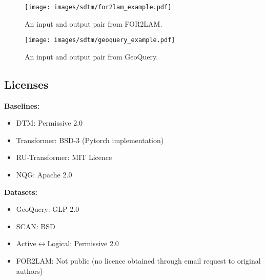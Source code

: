 \begin{figure}
    \centering
    \texttt{[image: images/sdtm/for2lam\_example.pdf]}
    \caption{An input and output pair from FOR2LAM. }
    \label{fig:for2lam-sample}
\end{figure}

\begin{figure}
    \centering
    \texttt{[image: images/sdtm/geoquery\_example.pdf]}
    \caption{An input and output pair from GeoQuery. }
    \label{fig:geoquery-sample}
\end{figure}

\subsection{Licenses} \label{sec:sdtm-licenses}
\textbf{Baselines:}
\begin{itemize}
    \item DTM: Permissive 2.0
    \item Transformer: BSD-3 (Pytorch implementation)
    \item RU-Transformer: MIT Licence 
    \item NQG: Apache 2.0
\end{itemize}

\textbf{Datasets:}
\begin{itemize}
    \item GeoQuery: GLP 2.0
    \item SCAN: BSD
    \item Active$\leftrightarrow$Logical: Permissive 2.0
    \item FOR2LAM: Not public (no licence obtained through email request to original authors)
\end{itemize}